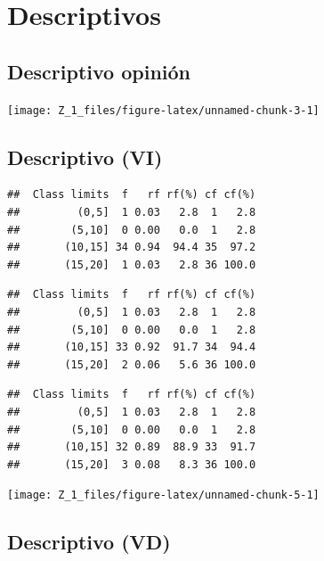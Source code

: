 \documentclass[12pt,]{report}
\begin{document}
\hypertarget{descriptivos}{%
\section{Descriptivos}\label{descriptivos}}

\hypertarget{descriptivo-opiniuxf3n}{%
\subsection{Descriptivo opinión}\label{descriptivo-opiniuxf3n}}

\begin{center}\texttt{[image: Z\_1\_files/figure-latex/unnamed-chunk-3-1]} \end{center}

\hypertarget{descriptivo-vi}{%
\subsection{Descriptivo (VI)}\label{descriptivo-vi}}

\begin{verbatim}
##  Class limits  f   rf rf(%) cf cf(%)
##         (0,5]  1 0.03   2.8  1   2.8
##        (5,10]  0 0.00   0.0  1   2.8
##       (10,15] 34 0.94  94.4 35  97.2
##       (15,20]  1 0.03   2.8 36 100.0
\end{verbatim}

\begin{verbatim}
##  Class limits  f   rf rf(%) cf cf(%)
##         (0,5]  1 0.03   2.8  1   2.8
##        (5,10]  0 0.00   0.0  1   2.8
##       (10,15] 33 0.92  91.7 34  94.4
##       (15,20]  2 0.06   5.6 36 100.0
\end{verbatim}

\begin{verbatim}
##  Class limits  f   rf rf(%) cf cf(%)
##         (0,5]  1 0.03   2.8  1   2.8
##        (5,10]  0 0.00   0.0  1   2.8
##       (10,15] 32 0.89  88.9 33  91.7
##       (15,20]  3 0.08   8.3 36 100.0
\end{verbatim}

\begin{center}\texttt{[image: Z\_1\_files/figure-latex/unnamed-chunk-5-1]} \end{center}

\hypertarget{descriptivo-vd}{%
\subsection{Descriptivo (VD)}\label{descriptivo-vd}}
\end{document}
